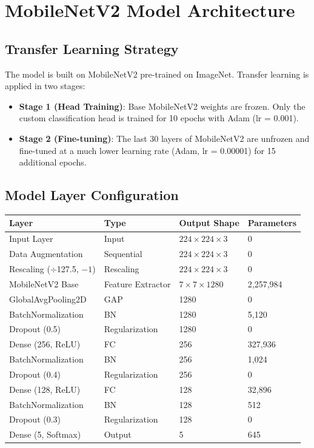 \documentclass[12pt,a4paper]{report}
\begin{document}
\section{MobileNetV2 Model Architecture}

\subsection{Transfer Learning Strategy}
The model is built on MobileNetV2 pre-trained on ImageNet. Transfer learning is applied in two stages:
\begin{itemize}
    \item \textbf{Stage 1 (Head Training)}: Base MobileNetV2 weights are frozen. Only the custom classification head is trained for 10 epochs with Adam (lr = 0.001).
    \item \textbf{Stage 2 (Fine-tuning)}: The last 30 layers of MobileNetV2 are unfrozen and fine-tuned at a much lower learning rate (Adam, lr = 0.00001) for 15 additional epochs.
\end{itemize}

\subsection{Model Layer Configuration}

\begin{center}
\begin{tabular}{|p{4cm}|p{2.5cm}|p{3cm}|p{3cm}|}
\hline
\textbf{Layer} & \textbf{Type} & \textbf{Output Shape} & \textbf{Parameters} \\
\hline
Input Layer & Input & $224 \times 224 \times 3$ & 0 \\
\hline
Data Augmentation & Sequential & $224 \times 224 \times 3$ & 0 \\
\hline
Rescaling ($\div$127.5, $-1$) & Rescaling & $224 \times 224 \times 3$ & 0 \\
\hline
MobileNetV2 Base & Feature Extractor & $7 \times 7 \times 1280$ & 2,257,984 \\
\hline
GlobalAvgPooling2D & GAP & 1280 & 0 \\
\hline
BatchNormalization & BN & 1280 & 5,120 \\
\hline
Dropout (0.5) & Regularization & 1280 & 0 \\
\hline
Dense (256, ReLU) & FC & 256 & 327,936 \\
\hline
BatchNormalization & BN & 256 & 1,024 \\
\hline
Dropout (0.4) & Regularization & 256 & 0 \\
\hline
Dense (128, ReLU) & FC & 128 & 32,896 \\
\hline
BatchNormalization & BN & 128 & 512 \\
\hline
Dropout (0.3) & Regularization & 128 & 0 \\
\hline
Dense (5, Softmax) & Output & 5 & 645 \\
\hline
\end{tabular}
\end{center}
\end{document}
